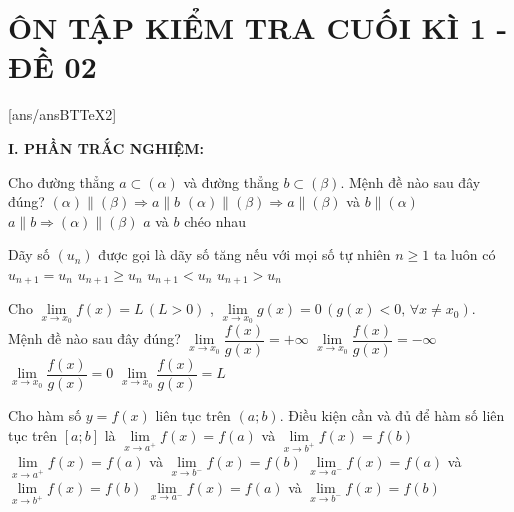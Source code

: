 ﻿\section*{ÔN TẬP KIỂM TRA CUỐI KÌ 1 - ĐỀ 02}
\setcounter{ex}{0}\setcounter{bt}{0}
[ans/ansBTTeX2]

\noindent\textbf{I. PHẦN TRẮC NGHIỆM:}
\begin{ex}%
Cho đường thẳng $a \subset \left(\alpha \right)$ và đường thẳng $b \subset \left(\beta \right)$. Mệnh đề nào sau đây đúng?
\choice
{$\left(\alpha \right) \parallel \left(\beta \right) \Rightarrow a \parallel b$}
{\True $\left(\alpha \right) \parallel \left(\beta \right) \Rightarrow a \parallel \left(\beta \right)$ và $b \parallel \left(\alpha \right)$}
{$a \parallel b \Rightarrow \left(\alpha \right) \parallel \left(\beta \right)$}
{$a$ và $b$ chéo nhau}
\end{ex}

\begin{ex}%
Dãy số $(u_n)$ được gọi là dãy số tăng nếu với mọi số tự nhiên $n \ge 1$ ta luôn có
\choice
{$u_{n+1}=u_n$}
{$u_{n+1} \ge u_n$}
{$u_{n+1} < u_n$}
{\True $u_{n+1} > u_n$}
\end{ex}

\begin{ex}%
Cho $\lim\limits_{x\to{x_0}}f(x)=L\,\left(L > 0\right)$ , $\lim\limits_{x\to{x_0}}g(x)=0\,\left(g(x) < 0,\,\forall x\ne{x_0}\right)$. Mệnh đề nào sau đây đúng?
\choice
{$\lim\limits_{x\to{x_0}}\dfrac{f(x)}{g(x)}=+\infty $}
{\True $\lim\limits_{x\to{x_0}}\dfrac{f(x)}{g(x)}=-\infty $}
{$\lim\limits_{x\to{x_0}}\dfrac{f(x)}{g(x)}=0$}
{$\lim\limits_{x\to{x_0}}\dfrac{f(x)}{g(x)}=L$}
\end{ex}

\begin{ex}%
Cho hàm số $y=f(x)$ liên tục trên $(a;b)$. Điều kiện cần và đủ để hàm số liên tục trên $[a;b]$ là
\choice
{$\lim\limits_{x\to a^+}f(x)=f(a)$ và $\lim\limits_{x\to b^+}f(x)=f(b)$}
{\True $\lim\limits_{x\to a^+}f(x)=f(a)$ và $\lim\limits_{x\to b^-}f(x)=f(b)$}
{$\lim\limits_{x\to a^-}f(x)=f(a)$ và $\lim\limits_{x\to b^+}f(x)=f(b)$}
{$\lim\limits_{x\to a^-}f(x)=f(a)$ và $\lim\limits_{x\to b^-}f(x)=f(b)$}
\end{ex}

